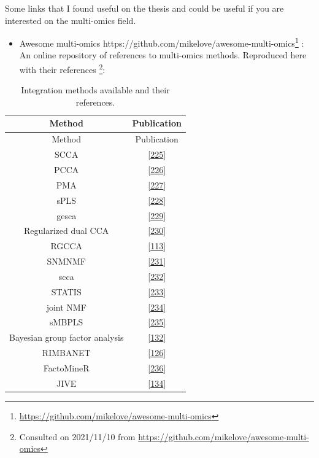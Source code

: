 \documentclass[
  a4paper,
]{book}
\DeclareRobustCommand{\href}[2]{#2\footnote{\url{#1}}}
\providecommand{\tightlist}{%
  \setlength{\itemsep}{0pt}\setlength{\parskip}{0pt}}
\begin{document}
Some links that I found useful on the thesis and could be useful if you are interested on the multi-omics field.

\begin{itemize}
\tightlist
\item
  \href{https://github.com/mikelove/awesome-multi-omics}{Awesome multi-omics https://github.com/mikelove/awesome-multi-omics} : An online repository of references to multi-omics methods. Reproduced here with their references \footnote{Consulted on 2021/11/10 from \url{https://github.com/mikelove/awesome-multi-omics}}:
\end{itemize}

\begin{longtable}[]{@{}cc@{}}
\caption{\label{tab:appendix-methods} Integration methods available and their references.}\tabularnewline
\toprule
Method & Publication \\
\midrule
\endfirsthead
\toprule
Method & Publication \\
\midrule
\endhead
SCCA & {[}\protect\hyperlink{ref-parkhomenko2009}{225}{]} \\
PCCA & {[}\protect\hyperlink{ref-waaijenborg2008}{226}{]} \\
PMA & {[}\protect\hyperlink{ref-witten2009}{227}{]} \\
sPLS & {[}\protect\hyperlink{ref-luxeacao2009}{228}{]} \\
gesca & {[}\protect\hyperlink{ref-hwang2009}{229}{]} \\
Regularized dual CCA & {[}\protect\hyperlink{ref-soneson2010}{230}{]} \\
RGCCA & {[}\protect\hyperlink{ref-tenenhaus_regularized_2011}{113}{]} \\
SNMNMF & {[}\protect\hyperlink{ref-zhang2011}{231}{]} \\
scca & {[}\protect\hyperlink{ref-lee2011}{232}{]} \\
STATIS & {[}\protect\hyperlink{ref-abdi2012}{233}{]} \\
joint NMF & {[}\protect\hyperlink{ref-zhang2012}{234}{]} \\
sMBPLS & {[}\protect\hyperlink{ref-li2012}{235}{]} \\
Bayesian group factor analysis & {[}\protect\hyperlink{ref-virtanen2012}{132}{]} \\
RIMBANET & {[}\protect\hyperlink{ref-zhu2012}{126}{]} \\
FactoMineR & {[}\protect\hyperlink{ref-abdi2013}{236}{]} \\
JIVE & {[}\protect\hyperlink{ref-lock2013a}{134}{]} \\

\end{longtable}
\end{document}
